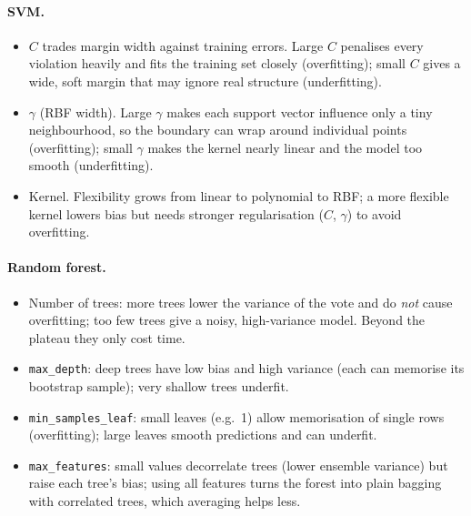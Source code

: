 \documentclass[11pt]{article}
\begin{document}
\paragraph{SVM.}
\begin{itemize}
\item $C$ trades margin width against training errors. Large $C$ penalises every violation heavily and
fits the training set closely (overfitting); small $C$ gives a wide, soft margin that may ignore real
structure (underfitting).
\item $\gamma$ (RBF width). Large $\gamma$ makes each support vector influence only a tiny neighbourhood,
so the boundary can wrap around individual points (overfitting); small $\gamma$ makes the kernel
nearly linear and the model too smooth (underfitting).
\item Kernel. Flexibility grows from linear to polynomial to RBF; a more flexible kernel lowers bias
but needs stronger regularisation ($C$, $\gamma$) to avoid overfitting.
\end{itemize}
\paragraph{Random forest.}
\begin{itemize}
\item Number of trees: more trees lower the variance of the vote and do \emph{not} cause overfitting;
too few trees give a noisy, high-variance model. Beyond the plateau they only cost time.
\item \texttt{max\_depth}: deep trees have low bias and high variance (each can memorise its bootstrap
sample); very shallow trees underfit.
\item \texttt{min\_samples\_leaf}: small leaves (e.g.\ 1) allow memorisation of single rows (overfitting);
large leaves smooth predictions and can underfit.
\item \texttt{max\_features}: small values decorrelate trees (lower ensemble variance) but raise each
tree's bias; using all features turns the forest into plain bagging with correlated trees, which
averaging helps less.
\end{itemize}
\end{document}
